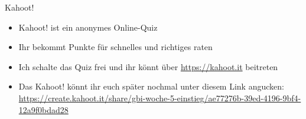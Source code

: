  \framePrevEpisode

\begin{frame}{Kahoot!}
	\begin{itemize}[<+->]
		\item Kahoot! ist ein anonymes Online-Quiz
		\item Ihr bekommt Punkte für schnelles und richtiges raten
		\item Ich schalte das Quiz frei und ihr könnt über \url{https://kahoot.it} beitreten
		\item Das Kahoot! könnt ihr euch später nochmal unter diesem Link angucken: \\
			\url{https://create.kahoot.it/share/gbi-woche-5-einstieg/ae77276b-39ed-4196-9bf4-12a9f0bdad28}
	\end{itemize}
\end{frame}
 


